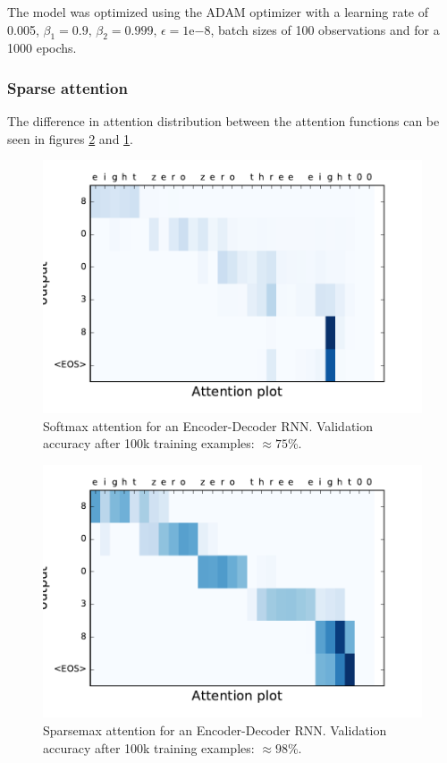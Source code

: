The model was optimized using the ADAM optimizer with a learning rate of 0.005, $\beta_1=0.9, \, \beta_2 = 0.999, \, \epsilon = 1\mathrm{e}{-8}$, batch sizes of 100 observations and for a 1000 epochs.

\subsubsection{Sparse attention}
The difference in attention distribution between the attention functions can be seen in figures \ref{fig:sparsemax} and \ref{fig:softmax}.

\begin{figure}[H]
	\centering
	\includegraphics[scale=0.5,trim={5mm 12mm 5mm 5mm},clip]{figures/attention_softmax.pdf}
	\caption{Softmax attention for an Encoder-Decoder RNN. Validation accuracy after 100k training examples: $\approx 75$\%.}
	\label{fig:softmax}
\end{figure}
\begin{figure}[H]
 	\centering
 	\includegraphics[scale=0.5,trim={5mm 12mm 5mm 5mm},clip]{figures/attention_sparsemax.pdf}
 	\caption{Sparsemax attention for an Encoder-Decoder RNN. Validation accuracy after 100k training examples: $\approx 98$\%.}
 	\label{fig:sparsemax}
\end{figure}
  
